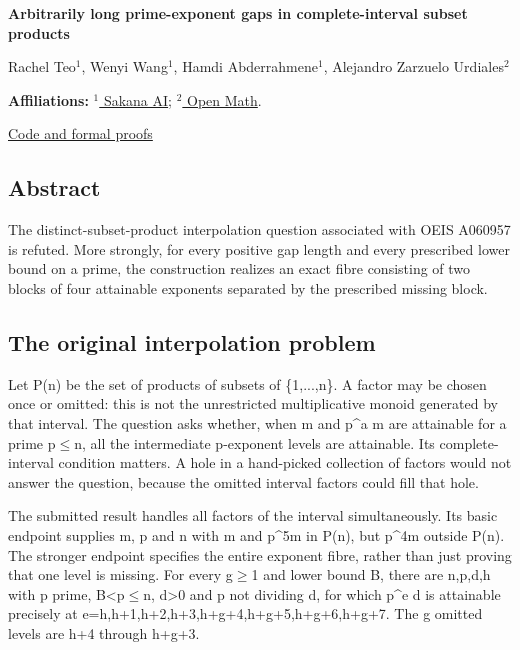 \documentclass[11pt,a4paper]{article}
\begin{document}
{\LARGE\bfseries Arbitrarily long prime-exponent gaps in complete-interval subset products\par}\medskip
{\small Rachel Teo\ensuremath{^1}, Wenyi Wang\ensuremath{^1}, Hamdi Abderrahmene\ensuremath{^1}, Alejandro Zarzuelo Urdiales\ensuremath{^2}\par}\medskip
{\small\textbf{Affiliations:} \href{https://sakana.ai/}{\ensuremath{^1} Sakana AI}; \href{https://rsihouse.ai/openmath}{\ensuremath{^2} Open Math}.\par}

{\small\href{https://github.com/alejandrozu/openmath-2026-judging}{Code and formal proofs}\par}

\subsection{Abstract}
The distinct-subset-product interpolation question associated with OEIS A060957 is refuted. More strongly, for every positive gap length and every prescribed lower bound on a prime, the construction realizes an exact fibre consisting of two blocks of four attainable exponents separated by the prescribed missing block.

\subsection{The original interpolation problem}
Let P(n) be the set of products of subsets of \{1,...,n\}. A factor may be chosen once or omitted: this is not the unrestricted multiplicative monoid generated by that interval. The question asks whether, when m and p\textasciicircum{}a m are attainable for a prime p\ensuremath{\leq}n, all the intermediate p-exponent levels are attainable. Its complete-interval condition matters. A hole in a hand-picked collection of factors would not answer the question, because the omitted interval factors could fill that hole.

The submitted result handles all factors of the interval simultaneously. Its basic endpoint supplies m, p and n with m and p\textasciicircum{}5m in P(n), but p\textasciicircum{}4m outside P(n). The stronger endpoint specifies the entire exponent fibre, rather than just proving that one level is missing. For every g\ensuremath{\geq}1 and lower bound B, there are n,p,d,h with p prime, B<p\ensuremath{\leq}n, d>0 and p not dividing d, for which p\textasciicircum{}e d is attainable precisely at e=h,h+1,h+2,h+3,h+g+4,h+g+5,h+g+6,h+g+7. The g omitted levels are h+4 through h+g+3.
\end{document}
